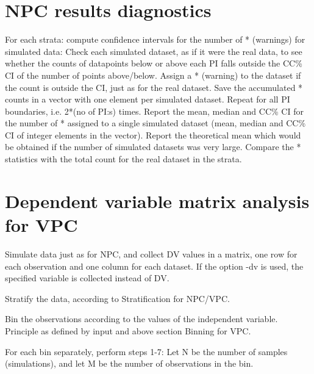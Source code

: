 \section{NPC results diagnostics}
For each strata: compute confidence intervals for the number of * (warnings) for simulated data: Check each simulated dataset, as if it were the real data, to see whether the counts of datapoints below or above each PI falls outside the CC\% CI of the number of points above/below. Assign a * (warning) to the dataset if the count is outside the CI, just as for the real dataset. Save the accumulated * counts in a vector with one element per simulated dataset. Repeat for all PI boundaries, i.e. 2*(no of PI:s) times. Report the mean, median and CC\% CI for the number of * assigned to a single simulated dataset (mean, median and CC\% CI of integer elements in the vector). Report the theoretical mean which would be obtained if the number of simulated datasets was very large. Compare the * statistics with the total count for the real dataset in the strata. 

\section{Dependent variable matrix analysis for VPC}
Simulate data just as for NPC, and collect DV values in a matrix, one row for each observation and one column for each dataset. If the option -dv is used, the specified variable is collected instead of DV.

Stratify the data, according to Stratification for NPC/VPC.

Bin the observations according to the values of the independent variable. Principle as defined by input and above section Binning for VPC.

For each bin separately, perform steps 1-7: 
Let N be the number of samples (simulations), and let M be the number of observations in the bin.

